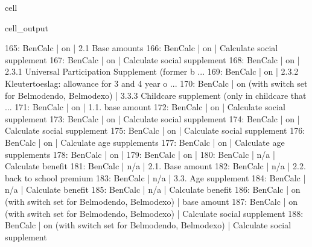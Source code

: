 \documentclass[letterpaper,10pt,english]{sphinxmanual}
\begin{document}
\begin{sphinxuseclass}{cell}
\begin{sphinxuseclass}{cell_output}
\begin{sphinxVerbatim}[commandchars=\\\{\}]
165: BenCalc     | on                                                       |     2.1 Base amounts 
166: BenCalc     | on                                                       |    Calculate social supplement 
167: BenCalc     | on                                                       |    Calculate social supplement 
168: BenCalc     | on                                                       |    2.3.1 Universal Participation Supplement (former b ... 
169: BenCalc     | on                                                       |    2.3.2 Kleutertoeslag: allowance for 3 and 4 year o ... 
170: BenCalc     | on (with switch set for Belmod\PYGZus{}endo, Belmod\PYGZus{}exo)         |    3.3.3 Childcare supplement (only in childcare that ... 
171: BenCalc     | on                                                       |    1.1. base amount 
172: BenCalc     | on                                                       |    Calculate social supplement 
173: BenCalc     | on                                                       |    Calculate social supplement 
174: BenCalc     | on                                                       |    Calculate social supplement 
175: BenCalc     | on                                                       |    Calculate social supplement 
176: BenCalc     | on                                                       |    Calculate age supplements 
177: BenCalc     | on                                                       |    Calculate age supplements 
178: BenCalc     | on                                                       |     
179: BenCalc     | on                                                       |     
180: BenCalc     | n/a                                                      |    Calculate benefit 
181: BenCalc     | n/a                                                      |    2.1. Base amount 
182: BenCalc     | n/a                                                      |    2.2. back to school premium 
183: BenCalc     | n/a                                                      |    3.3. Age supplement 
184: BenCalc     | n/a                                                      |    Calculate benefit 
185: BenCalc     | n/a                                                      |    Calculate benefit 
186: BenCalc     | on (with switch set for Belmod\PYGZus{}endo, Belmod\PYGZus{}exo)         |    base amount 
187: BenCalc     | on (with switch set for Belmod\PYGZus{}endo, Belmod\PYGZus{}exo)         |    Calculate social supplement 
188: BenCalc     | on (with switch set for Belmod\PYGZus{}endo, Belmod\PYGZus{}exo)         |    Calculate social supplement 

\end{sphinxVerbatim}
\end{sphinxuseclass}
\end{sphinxuseclass}
\end{document}
